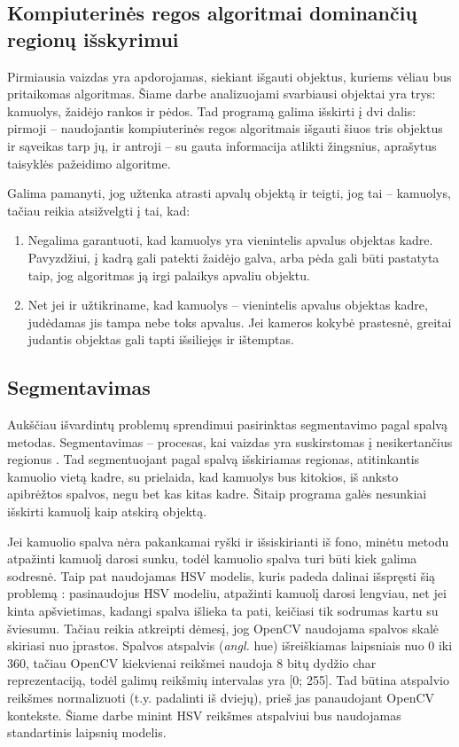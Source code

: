 \documentclass{VUMIFPSkursinis}
\begin{document}
\subsection{Kompiuterinės regos algoritmai dominančių regionų išskyrimui}
Pirmiausia vaizdas yra apdorojamas, siekiant išgauti objektus, kuriems vėliau bus pritaikomas algoritmas. Šiame darbe analizuojami svarbiausi objektai yra trys: kamuolys, žaidėjo rankos ir pėdos. Tad programą galima išskirti į dvi dalis: pirmoji – naudojantis kompiuterinės regos algoritmais išgauti šiuos tris objektus ir sąveikas tarp jų, ir antroji – su gauta informacija atlikti žingsnius, aprašytus taisyklės pažeidimo algoritme. 

Galima pamanyti, jog užtenka atrasti apvalų objektą ir teigti, jog tai – kamuolys, tačiau reikia atsižvelgti į tai, kad: 
\begin{enumerate}
\item Negalima garantuoti, kad kamuolys yra vienintelis apvalus objektas kadre. Pavyzdžiui, į kadrą gali patekti žaidėjo galva, arba pėda gali būti pastatyta taip, jog algoritmas ją irgi palaikys apvaliu objektu. 
\item Net jei ir užtikriname, kad kamuolys – vienintelis apvalus objektas kadre, judėdamas jis tampa nebe toks apvalus. Jei kameros kokybė prastesnė, greitai judantis objektas gali tapti išsiliejęs ir ištemptas.
\end{enumerate}
\subsection{Segmentavimas}
Aukščiau išvardintų problemų sprendimui pasirinktas segmentavimo pagal spalvą metodas. Segmentavimas – procesas, kai vaizdas yra suskirstomas į nesikertančius regionus \cite{ImageSegmTech}. Tad segmentuojant pagal spalvą išskiriamas regionas, atitinkantis kamuolio vietą kadre, su prielaida, kad kamuolys bus kitokios, iš anksto apibrėžtos spalvos, negu bet kas kitas kadre. Šitaip programa galės nesunkiai išskirti kamuolį kaip atskirą objektą. 

Jei kamuolio spalva nėra pakankamai ryški ir išsiskirianti iš fono, minėtu metodu atpažinti kamuolį darosi sunku, todėl kamuolio spalva turi būti kiek galima sodresnė. Taip pat naudojamas HSV modelis, kuris padeda dalinai išspręsti šią problemą \cite{StaloTenisas}: pasinaudojus HSV modeliu, atpažinti kamuolį darosi lengviau, net jei kinta apšvietimas, kadangi spalva išlieka ta pati, keičiasi tik sodrumas kartu su šviesumu. Tačiau reikia atkreipti dėmesį, jog OpenCV naudojama spalvos skalė skiriasi nuo įprastos. Spalvos atspalvis (\textit{angl.} hue) išreiškiamas laipsniais nuo 0 iki 360, tačiau OpenCV kiekvienai reikšmei naudoja 8 bitų dydžio char reprezentaciją, todėl galimų reikšmių intervalas yra [0; 255]. Tad būtina atspalvio reikšmes normalizuoti (t.y. padalinti iš dviejų), prieš jas panaudojant OpenCV kontekste. Šiame darbe minint HSV reikšmes atspalviui bus naudojamas standartinis laipsnių modelis.
\end{document}
